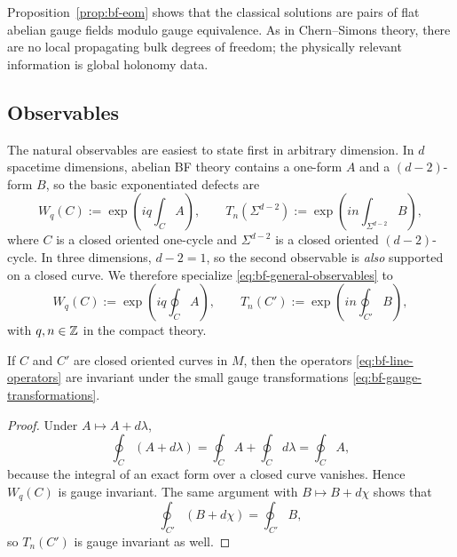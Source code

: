 \noindent Proposition~\ref{prop:bf-eom} shows that the classical solutions are pairs of flat abelian gauge fields modulo gauge equivalence. As in Chern--Simons theory, there are no local propagating bulk degrees of freedom; the physically relevant information is global holonomy data.

\subsection{Observables}

The natural observables are easiest to state first in arbitrary dimension. In $d$ spacetime dimensions, abelian BF theory contains a one-form $A$ and a $(d-2)$-form $B$, so the basic exponentiated defects are
\begin{equation}\label{eq:bf-general-observables}
W_q(C) := \exp\!\left(iq\int_C A\right),
\qquad
T_n(\Sigma^{d-2}) := \exp\!\left(in\int_{\Sigma^{d-2}} B\right),
\end{equation}
where $C$ is a closed oriented one-cycle and $\Sigma^{d-2}$ is a closed oriented $(d-2)$-cycle. In three dimensions, $d-2=1$, so the second observable is \emph{also} supported on a closed curve. We therefore specialize \eqref{eq:bf-general-observables} to
\begin{equation}\label{eq:bf-line-operators}
W_q(C) := \exp\!\left(iq\oint_C A\right),
\qquad
T_n(C') := \exp\!\left(in\oint_{C'} B\right),
\end{equation}
with $q,n\in \mathbb{Z}$ in the compact theory.

\begin{proposition}\label{prop:bf-obs-gauge}
If $C$ and $C'$ are closed oriented curves in $M$, then the operators \eqref{eq:bf-line-operators} are invariant under the small gauge transformations \eqref{eq:bf-gauge-transformations}.
\end{proposition}

\begin{proof}
Under $A\mapsto A+d\lambda$,
\begin{equation*}
\oint_C (A+d\lambda)
=
\oint_C A + \oint_C d\lambda
=
\oint_C A,
\end{equation*}
because the integral of an exact form over a closed curve vanishes. Hence $W_q(C)$ is gauge invariant. The same argument with $B\mapsto B+d\chi$ shows that
\begin{equation*}
\oint_{C'} (B+d\chi)=\oint_{C'}B,
\end{equation*}
so $T_n(C')$ is gauge invariant as well.
\end{proof}

